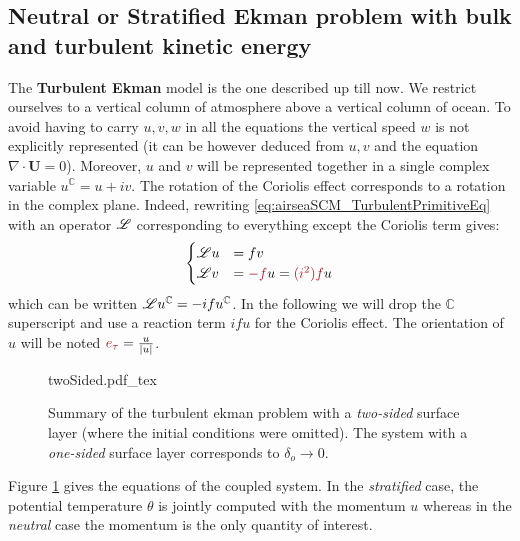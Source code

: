 \subsection{Neutral or Stratified Ekman problem with bulk and turbulent kinetic energy}
\label{sec:airseaSCM_hierarchy_TurbulentEkman}
The \textbf{Turbulent Ekman} model is the one described up till now.
We restrict ourselves to a vertical column of atmosphere
above a vertical column of ocean.
To avoid having to carry $u, v, w$ in all the equations
the vertical speed $w$ is not explicitly represented
(it can be however deduced from $u,v$ and the equation
$\nabla \cdot \mathbf{U}=0$).
Moreover, $u$ and $v$ will be represented together in
a single complex variable $u^{\mathbb{C}} = u+iv$.
The rotation of the Coriolis effect corresponds to
a rotation in the complex plane.
Indeed, rewriting \eqref{eq:airseaSCM_TurbulentPrimitiveEq}
with an operator ${\cal L}$ corresponding to everything except
the Coriolis term gives:
\begin{equation}
	\label{eq:airseaSCM_complexForm}
\begin{cases}
	{\cal L}u &= fv\\
	{\cal L}v &= \emphase{- f}u = \emphase{(i^2) f} u
\end{cases}
\end{equation}
which can be written ${\cal L}u^{\mathbb{C}} = -i f u^\mathbb{C}$.
In the following we will drop the ${\mathbb{C}}$ superscript
and use a reaction term $ifu$ for the Coriolis effect. The
orientation of $u$ will be noted $\emphase{e_\tau} = \frac{u}{|u|}$.
\begin{figure}
	\centering
	{twoSided.pdf_tex}
	\caption{Summary
	of the turbulent ekman problem with a
	\textit{two-sided} surface layer (where
	the initial conditions were omitted). The 
	system with a \textit{one-sided} surface layer corresponds
	to $\delta_o \rightarrow 0$.
	}
	\label{fig:airseaSCM_twoSidedBulk_drawing}
\end{figure}
Figure \ref{fig:airseaSCM_twoSidedBulk_drawing} gives
the equations of the coupled system. In the \textit{stratified}
case, the potential temperature $\theta$ is jointly computed with the
momentum $u$ whereas in the \textit{neutral} case the momentum
is the only quantity of interest.
